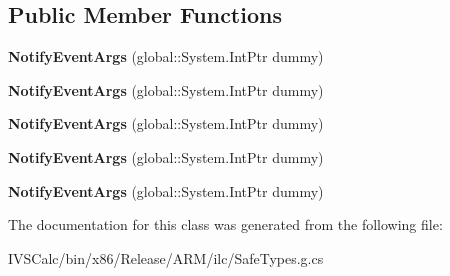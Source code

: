 \subsection*{Public Member Functions}
\begin{DoxyCompactItemize}
\item 
\mbox{\label{class_windows_1_1_u_i_1_1_xaml_1_1_controls_1_1_notify_event_args_a783ebbd2dbade5303d94a3679c813c91}} 
{\bfseries Notify\+Event\+Args} (global\+::\+System.\+Int\+Ptr dummy)
\item 
\mbox{\label{class_windows_1_1_u_i_1_1_xaml_1_1_controls_1_1_notify_event_args_a783ebbd2dbade5303d94a3679c813c91}} 
{\bfseries Notify\+Event\+Args} (global\+::\+System.\+Int\+Ptr dummy)
\item 
\mbox{\label{class_windows_1_1_u_i_1_1_xaml_1_1_controls_1_1_notify_event_args_a783ebbd2dbade5303d94a3679c813c91}} 
{\bfseries Notify\+Event\+Args} (global\+::\+System.\+Int\+Ptr dummy)
\item 
\mbox{\label{class_windows_1_1_u_i_1_1_xaml_1_1_controls_1_1_notify_event_args_a783ebbd2dbade5303d94a3679c813c91}} 
{\bfseries Notify\+Event\+Args} (global\+::\+System.\+Int\+Ptr dummy)
\item 
\mbox{\label{class_windows_1_1_u_i_1_1_xaml_1_1_controls_1_1_notify_event_args_a783ebbd2dbade5303d94a3679c813c91}} 
{\bfseries Notify\+Event\+Args} (global\+::\+System.\+Int\+Ptr dummy)
\end{DoxyCompactItemize}


The documentation for this class was generated from the following file\+:\begin{DoxyCompactItemize}
\item 
I\+V\+S\+Calc/bin/x86/\+Release/\+A\+R\+M/ilc/Safe\+Types.\+g.\+cs\end{DoxyCompactItemize}
